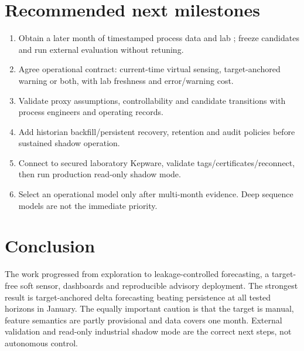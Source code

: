 \documentclass[10pt,a4paper]{article}
\begin{document}
\section{Recommended next milestones}
\begin{enumerate}
\item Obtain a later month of timestamped process data and lab ; freeze candidates and run external evaluation without retuning.
\item Agree operational contract: current-time virtual sensing, target-anchored warning or both, with lab freshness and error/warning cost.
\item Validate proxy assumptions, controllability and candidate transitions with process engineers and operating records.
\item Add historian backfill/persistent recovery, retention and audit policies before sustained shadow operation.
\item Connect to secured laboratory Kepware, validate tags/certificates/reconnect, then run production read-only shadow mode.
\item Select an operational model only after multi-month evidence. Deep sequence models are not the immediate priority.\end{enumerate}

\section*{Conclusion}
The work progressed from exploration to leakage-controlled forecasting, a target-free soft sensor, dashboards and reproducible advisory deployment. The strongest result is target-anchored delta forecasting beating persistence at all tested horizons in January. The equally important caution is that the target is manual, feature semantics are partly provisional and data covers one month. External validation and read-only industrial shadow mode are the correct next steps, not autonomous control.
\end{document}
